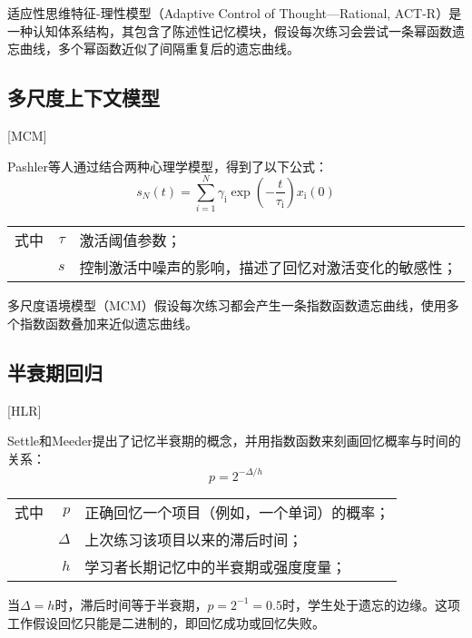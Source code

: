 适应性思维特征-理性模型（Adaptive Control of Thought—Rational, ACT-R）\cite{andersonIntegratedTheoryMind2004}是一种认知体系结构，其包含了陈述性记忆模块，假设每次练习会尝试一条幂函数遗忘曲线，多个幂函数近似了间隔重复后的遗忘曲线。

\subsection{多尺度上下文模型}[MCM]

Pashler等人\cite{pashlerPredictingOptimalSpacing2009}通过结合两种心理学模型，得到了以下公式：
\begin{equation}
    s_{N}(t)=\sum_{i=1}^{N} \gamma_\mathrm{i} \exp \left(-\frac{t}{\tau_\mathrm{i}}\right) x_\mathrm{i}(0)
\end{equation}
\begin{tabularx}{\textwidth}{@{}l@{\quad}r@{———}X@{}}
    式中& $\tau$ &激活阈值参数；\\
    & $s$ &控制激活中噪声的影响，描述了回忆对激活变化的敏感性；
\end{tabularx}\vspace{3.15bp}

多尺度语境模型（MCM）\cite{pashlerPredictingOptimalSpacing2009}假设每次练习都会产生一条指数函数遗忘曲线，使用多个指数函数叠加来近似遗忘曲线。

\subsection{半衰期回归}[HLR]\label{sec:HLR}

Settle和Meeder\cite{settlesTrainableSpacedRepetition2016}提出了记忆半衰期的概念，并用指数函数来刻画回忆概率与时间的关系：
\begin{equation}
p = 2^{-\Delta/h}
\end{equation}
\begin{tabularx}{\textwidth}{@{}l@{\quad}r@{———}X@{}}
    式中& $p$ &正确回忆一个项目（例如，一个单词）的概率；\\
    & $\Delta$ &上次练习该项目以来的滞后时间；\\
    & $h$ &学习者长期记忆中的半衰期或强度度量；
\end{tabularx}\vspace{3.15bp}

当$\Delta=h$时，滞后时间等于半衰期，$p=2^{-1}=0.5$时，学生处于遗忘的边缘。这项工作假设回忆只能是二进制的，即回忆成功或回忆失败。

